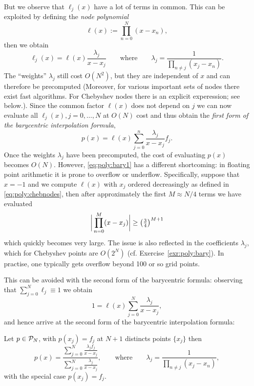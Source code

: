 But we observe that $\ell_j(x)$ have a lot of terms in common. This can be 
exploited by defining the {\em node polynomial}
\[
   \ell(x) := \prod_{n = 0}^N (x-x_n),
\]
then we obtain 
\begin{equation} \label{eq:poly:bary_weights}
   \ell_j(x) = \ell(x) \frac{\lambda_j}{x - x_j} 
   \qquad \text{where}  \qquad 
   \lambda_j = \frac{1}{\prod_{n \neq j} (x_j - x_n)}.
\end{equation}
The ``weights'' $\lambda_j$ still cost $O(N^2)$, but they are independent of $x$
and can therefore be precomputed (Moreover, for various important sets of nodes
there exist fast algorithms. For Chebyshev nodes there is an explicit
experession; see below.). Since the common factor $\ell(x)$ does not depend on
$j$ we can now evaluate all $\ell_j(x), j = 0, \dots, N$ at $O(N)$ cost and thus
obtain the {\em first form of the barycentric interpolation formula}, 
\begin{equation} \label{eq:poly:bary1}
   p(x) = \ell(x) \sum_{j = 0}^n \frac{\lambda_j}{x - x_j} f_j.
\end{equation}
Once the weights $\lambda_j$ have been precomputed, the cost of evaluating 
$p(x)$ becomes $O(N)$. However, \eqref{eq:poly:bary1} has a different 
shortcoming: in floating point arithmetic it is prone to overflow or underflow.
Specifically, suppose that $x = -1$ and we compute $\ell(x)$ with $x_j$ 
ordered decreasingly as defined in \eqref{eq:poly:chebnodes}, then after 
approximately the first $M \approx N/4$ terms we have evaluated 
\[
   \bigg|\prod_{n = 0}^M (x - x_j) \bigg|
   \geq \big( {\textstyle \frac{3}{4}} \big)^{M+1} 
\]
which quickly becomes very large. The issue is also reflected in the
coefficients $\lambda_j$, which for Chebyshev points are $O(2^N)$ (cf.
Exercise~\ref{exr:poly:bary}). In practise, one typically gets overflow 
beyond 100 or so grid points. 

This can be avoided with the second form of the barycentric formula: observing
that $\sum_{j = 0}^N \ell_j \equiv 1$ we obtain 
\[
   1 = \ell(x) \sum_{j = 0}^N \frac{\lambda_j}{x-x_j}, 
\]
and hence arrive at the second form of the barycentric interpolation formula:

\begin{theorem}
   \label{th:poly:bary}
   Let $p \in \mathcal{P}_N$, with $p(x_j) = f_j$ at $N+1$ distincts points 
   $\{x_j\}$ then 
   \[
      p(x) = \frac{ 
         \sum_{j = 0}^N \frac{\lambda_j f_j}{x-x_j} 
      }{
         \sum_{j = 0}^N \frac{\lambda_j}{x-x_j}
      }, 
      \qquad \text{where} \qquad 
      \lambda_j = \frac{1}{ \prod_{n \neq j} (x_j-x_n)},
   \] 
   with the special case $p(x_j) = f_j$.
\end{theorem}

